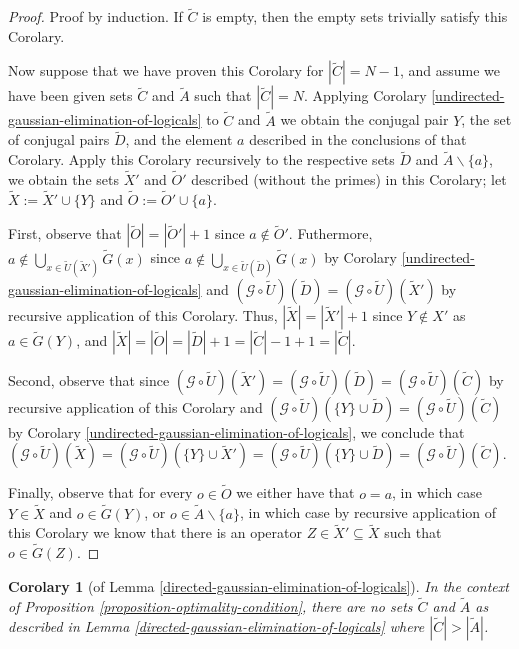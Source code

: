 \documentclass[twocolumn,showpacs,preprintnumbers,amsmath,amssymb,nofootinbib,pra,floatfix]{revtex4-1}
\newtheorem{corolary}{Corolary}
\newcommand{\set}{\tilde}
\newcommand{\genfun}{\mathcal{G}}
\begin{document}
\begin{proof}
Proof by induction.  If $\set C$ is empty, then the empty sets trivially satisfy this Corolary.

Now suppose that we have proven this Corolary for $|\set C|=N-1$, and assume we have been given sets $\set C$ and $\set A$ such that $|\set C|=N$.  Applying Corolary \ref{undirected-gaussian-elimination-of-logicals} to $\set C$ and $\set A$ we obtain the conjugal pair $Y$,  the set of conjugal pairs $\set D$, and the element $a$ described in the conclusions of that Corolary.  Apply this Corolary recursively to the respective sets $\set D$ and $\set A\backslash\{a\}$, we obtain the sets $\set X'$ and $\set O'$ described (without the primes) in this Corolary; let $\set X := \set X'\cup\{Y\}$ and $\set O:=\set O'\cup\{a\}$.

First, observe that $|\set O|=|\set O'|+1$ since $a\notin \set O'$.  Futhermore, $a\notin \bigcup_{x\in \set U(\set X')} \set G(x)$ since $a\notin \bigcup_{x\in \set U(\set D)} \set G(x)$ by Corolary \ref{undirected-gaussian-elimination-of-logicals} and $(\genfun\circ\set U)(\set D)=(\genfun\circ\set U)(\set X')$ by recursive application of this Corolary.  Thus, $|\set X|=|\set X'|+1$ since $Y\notin X'$ as $a\in\set G(Y)$, and $|\set X|=|\set O|=|\set D|+1=|\set C|-1+1=|\set C|$.

Second, observe that since $(\genfun\circ\set U)(\set X')=(\genfun\circ\set U)(\set D)=(\genfun\circ\set U)(\set C)$ by recursive application of this Corolary and $(\genfun\circ\set U)(\{Y\}\cup\set D)=(\genfun\circ\set U)(\set C)$ by Corolary \ref{undirected-gaussian-elimination-of-logicals}, we conclude that $(\genfun\circ\set U)(\set X) = (\genfun\circ\set U)(\{Y\}\cup\set X') = (\genfun\circ\set U)(\{Y\}\cup\set D) = (\genfun\circ\set U)(\set C)$.

Finally, observe that for every $o\in\set O$ we either have that $o=a$, in which case $Y\in\set X$ and $o\in\set G(Y)$, or $o\in \set A\backslash\{a\}$, in which case by recursive application of this Corolary we know that there is an operator $Z\in \set X'\subseteq \set X$ such that $o\in\set G(Z)$.
\end{proof}
\begin{corolary}[of Lemma \ref{directed-gaussian-elimination-of-logicals}]
In the context of Proposition \ref{proposition-optimality-condition}, there are no sets $\set C$ and $\set A$ as described in Lemma \ref{directed-gaussian-elimination-of-logicals} where $|\set C|>|\set A|$.
\end{corolary}
\end{document}
